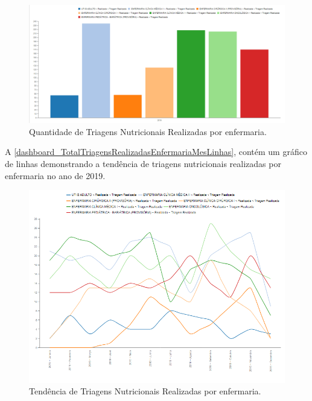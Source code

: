 \newpage
\begin{figure}[htb]
	\caption{\label{dashboard_TotalTriagensRealizadasEnfermariaAnoBarras}Quantidade de Triagens Nutricionais Realizadas por enfermaria.}
	\begin{center}
	    \includegraphics[scale=0.39]{Imagens/1.3.TotalTriagensRealizadasEnfermariaAnoBarras.png}
	\end{center}
\end{figure}

A \autoref{dashboard_TotalTriagensRealizadasEnfermariaMesLinhas}, contém um gráfico de linhas demonstrando a tendência de triagens nutricionais realizadas por enfermaria no ano de 2019.

\begin{figure}[htb]
	\caption{\label{dashboard_TotalTriagensRealizadasEnfermariaMesLinhas}Tendência de Triagens Nutricionais Realizadas por enfermaria.}
	\begin{center}
	    \includegraphics[scale=0.63]{Imagens/1.4.TotalTriagensRealizadasEnfermariaMesLinhas.png}
	\end{center}
\end{figure}

